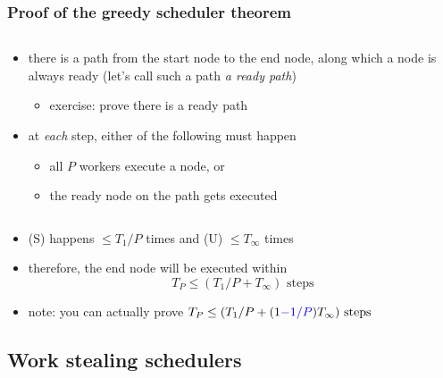 \documentclass[12pt,dvipdfmx]{beamer}
\newcommand{\ao}[1]{{\color{blue}#1}}
\begin{document}
\begin{frame}
\frametitle{Proof of the greedy scheduler theorem}
\begin{columns}
\begin{column}{0.6\textwidth}
\begin{itemize}
\item<1-> there is a path from the start node to the
  end node, along which a node is always ready
  (let's call such a path \ao{\em a ready path})
  \begin{itemize}
  \item exercise: prove there is a ready path
  \end{itemize}

\item<2-> at {\em each} step, either of the following must happen
  \begin{itemize}
  \item<3-> [(S)] all $P$ workers execute a node, or
  \item<4-> [(U)] the ready node on the path gets executed
  \end{itemize}
\end{itemize}
\end{column}
\begin{column}{0.4\textwidth}
\begin{center}
%
%
\end{center}
\end{column}
\end{columns}

\begin{itemize}
\item<5-> (S) happens $\leq T_1/P$ times and (U) $\leq T_\infty$ times
\item<6-> therefore, the end node will be executed within
\[ T_P \leq (T_1/P + T_\infty) \mbox{ steps} \]
\item<7-> {\small note: you can actually prove
$T_P \leq (T_1/P + (1 \ao{- 1/P}) T_\infty) \mbox{ steps}$}
\end{itemize}

\end{frame}

\subsection{Work stealing schedulers}
\end{document}
